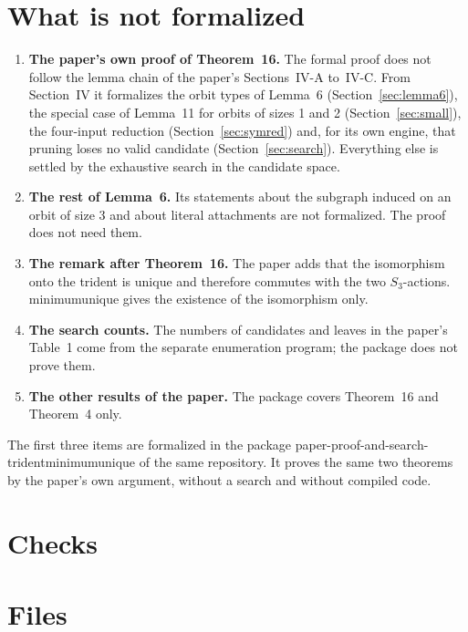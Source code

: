 \documentclass[11pt,a4paper]{article}
\newcommand{\leanus}{\textunderscore\allowbreak}
\newcommand{\lean}[1]{{\ttfamily\let\_\leanus #1}}
\theoremstyle{definition}
\begin{document}
\section{What is not formalized}\label{sec:gaps}
\begin{enumerate}
\item \textbf{The paper's own proof of Theorem~16.} The formal proof does
not follow the lemma chain of the paper's Sections~IV-A to~IV-C. From
Section~IV it formalizes the orbit types of Lemma~6
(Section~\ref{sec:lemma6}), the special case of Lemma~11 for orbits of sizes
1 and 2 (Section~\ref{sec:small}), the four-input reduction
(Section~\ref{sec:symred}) and, for its own engine, that pruning loses no
valid candidate (Section~\ref{sec:search}). Everything else is settled by
the exhaustive search in the candidate space.
\item \textbf{The rest of Lemma~6.} Its statements about the subgraph induced
on an orbit of size 3 and about literal attachments are not formalized. The
proof does not need them.
\item \textbf{The remark after Theorem~16.} The paper adds that the
isomorphism onto the trident is unique and therefore commutes with the two
$S_3$-actions. \lean{minimum\_unique} gives the existence of the isomorphism
only.
\item \textbf{The search counts.} The numbers of candidates and leaves in
the paper's Table~1 come from the separate enumeration program; the package
does not prove them.
\item \textbf{The other results of the paper.} The package covers Theorem~16
and Theorem~4 only.
\end{enumerate}
The first three items are formalized in the package
\lean{paper-proof-and-search-trident\_minimum\_unique} of the same
repository. It proves the same two theorems by the paper's own argument,
without a search and without compiled code.

\section{Checks}\label{sec:checks}


\appendix
\section{Files}

\end{document}
